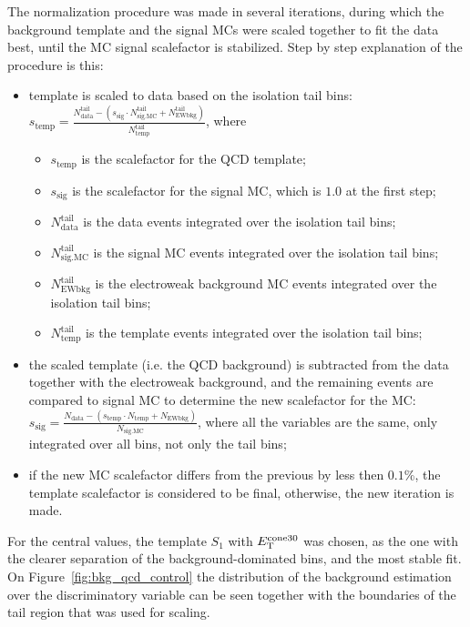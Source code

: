 The normalization procedure was made in several iterations, during which the background template and the signal MCs were scaled together to fit the data best, until the MC signal scalefactor is stabilized. Step by step explanation of the procedure is this:
\begin{itemize}
\item template is scaled to data based on the isolation tail bins: $s_{\mathrm{temp}} = \frac{N_{\mathrm{data}}^{\mathrm{tail}} - (s_{\mathrm{sig}} \cdot N_{\mathrm{sig.MC}}^{\mathrm{tail}}+N_{\mathrm{EWbkg}}^{\mathrm{tail}})}{N_{\mathrm{temp}}^{\mathrm{tail}}}$, where
\begin{itemize}
\item $s_{\mathrm{temp}}$ is the scalefactor for the QCD template;
\item $s_{\mathrm{sig}}$ is the scalefactor for the signal MC, which is $1.0$ at the first step;
\item $N_{\mathrm{data}}^{\mathrm{tail}}$ is the data events integrated over the isolation tail bins;
\item $N_{\mathrm{sig.MC}}^{\mathrm{tail}}$ is the signal MC events integrated over the isolation tail bins;
\item $N_{\mathrm{EWbkg}}^{\mathrm{tail}}$ is the electroweak background MC events integrated over the isolation tail bins;
\item $N_{\mathrm{temp}}^{\mathrm{tail}}$ is the template events integrated over the isolation tail bins;
\end{itemize}
\item the scaled template (i.e. the QCD background) is subtracted from the data together with the electroweak background, and the remaining events are compared to signal MC to determine the new scalefactor for the MC: $s_{\mathrm{sig}} = \frac{N_{\mathrm{data}} - (s_{\mathrm{temp}} \cdot N_{\mathrm{temp}} + N_{\mathrm{EWbkg}})}{N_{\mathrm{sig.MC}}}$, where all the variables are the same, only integrated over all bins, not only the tail bins;
\item if the new MC scalefactor differs from the previous by less then $0.1$\%, the template scalefactor is considered to be final, otherwise, the new iteration is made.
\end{itemize}
For the central values, the template $S_{1}$ with $E_{\mathrm{T}}^{\mathrm{cone30}}$ was chosen, as the one with the clearer separation of the background-dominated bins, and the most stable fit. On Figure~\ref{fig:bkg_qcd_control} the distribution of the background estimation over the discriminatory variable can be seen together with the boundaries of the tail region that was used for scaling.

